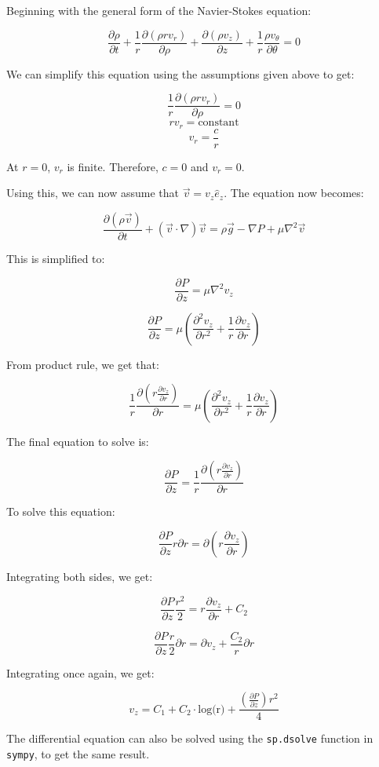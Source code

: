 \documentclass[12pt]{report}
\begin{document}
Beginning with the general form of the Navier-Stokes equation:

$$\frac{\partial\rho}{\partial t} + \frac{1}{r}\frac{\partial(\rho r v_r)}{\partial\rho} + \frac{\partial(\rho v_z)}{\partial z} + \frac{1}{r} \frac{\rho v_\theta}{\partial\theta} = 0$$

We can simplify this equation using the assumptions given above to get:

$$\frac{1}{r}\frac{\partial(\rho r v_r)}{\partial\rho} = 0$$
$$r v_r = \text{constant}$$
$$v_r = \frac{c}{r}$$

At $r = $0, $v_r$ is finite. Therefore, $c = 0$ and $v_r = 0$.

Using this, we can now assume that $\vec{v} = v_z \hat{e}_z$. The equation now becomes:

$$\frac{\partial(\rho \vec{v})}{\partial t} + (\vec{v} \cdot \nabla) \vec{v} = \rho\vec{g} - \nabla P + \mu \nabla^2\vec{v}$$

This is simplified to:

$$\frac{\partial P}{\partial z}= \mu \nabla^2v_z$$

$$\frac{\partial P}{\partial z} = \mu (\frac{\partial^2 v_z}{\partial r^2} + \frac{1}{r} \frac{\partial v_z}{\partial r})$$

From product rule, we get that:

$$\frac{1}{r}\frac{\partial(r \frac{\partial v_z}{\partial r})}{\partial r} = \mu (\frac{\partial^2 v_z}{\partial r^2} + \frac{1}{r} \frac{\partial v_z}{\partial r})$$

The final equation to solve is:

$$\frac{\partial P}{\partial z} = \frac{1}{r}\frac{\partial(r \frac{\partial v_z}{\partial r})}{\partial r}$$

To solve this equation:

$$\frac{\partial P}{\partial z} r \partial r = \partial(r \frac{\partial v_z}{\partial r})$$

Integrating both sides, we get:

$$\frac{\partial P}{\partial z} \frac{r^2}{2} = r \frac{\partial v_z}{\partial r} + C_2$$

$$\frac{\partial P}{\partial z} \frac{r}{2} \partial r = \partial v_z + \frac{C_2}{r} \partial r$$

Integrating once again, we get:

$$v_z = C_1 + C_2\cdot \text{log(r)} + \frac{(\frac{\partial P}{\partial z}) r^2}{4}$$

The differential equation can also be solved using the \texttt{sp.dsolve} function in \texttt{sympy}, to get the same result.
\end{document}
